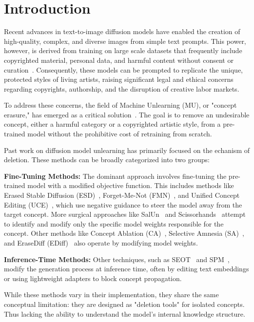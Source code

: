 \section{Introduction}
Recent advances in text-to-image diffusion models have enabled the creation of high-quality, complex, and diverse images from simple text prompts. This power, however, is derived from training on large scale datasets that frequently include copyrighted material, personal data, and harmful content without consent or curation~\cite{gandikota2023erasing}. Consequently, these models can be prompted to replicate the unique, protected styles of living artists, raising significant legal and ethical concerns regarding copyrights, authorship, and the disruption of creative labor markets.

To address these concerns, the field of Machine Unlearning (MU), or "concept erasure," has emerged as a critical solution~\cite{gandikota2023erasing, gandikota2024unified}. The goal is to remove an undesirable concept, either a harmful category or a copyrighted artistic style, from a pre-trained model without the prohibitive cost of retraining from scratch.

Past work on diffusion model unlearning has primarily focused on the echanism of deletion. These methods can be broadly categorized into two groups:

\textbf{Fine-Tuning Methods:} The dominant approach involves fine-tuning the pre-trained model with a modified objective function. This includes methods like Erased Stable Diffusion (ESD)~\cite{gandikota2023erasing}, Forget-Me-Not (FMN)~\cite{zhang2024forget}, and Unified Concept Editing (UCE)~\cite{gandikota2024unified}, which use negative guidance to steer the model away from the target concept. More surgical approaches like SalUn~\cite{fan2023salun} and Scissorhands~\cite{wu2024scissorhands} attempt to identify and modify only the specific model weights responsible for the concept. Other methods like Concept Ablation (CA)~\cite{vinker2023concept}, Selective Amnesia (SA)~\cite{heng2023selective}, and EraseDiff (EDiff)~\cite{wu2024erasediff} also operate by modifying model weights.

\textbf{Inference-Time Methods:} Other techniques, such as SEOT~\cite{li2024get} and SPM~\cite{lyu2024one}, modify the generation process at inference time, often by editing text embeddings or using lightweight adapters to block concept propagation.

While these methods vary in their implementation, they share the same conceptual limitation: they are designed as "deletion tools" for isolated concepts. Thus lacking the ability to understand the model's internal knowledge structure.

